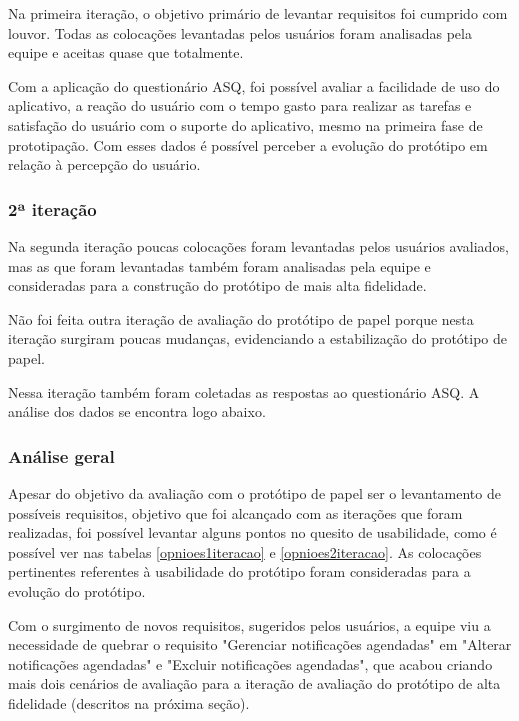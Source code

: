       Na primeira iteração, o objetivo primário de levantar requisitos foi cumprido com louvor.
      Todas as colocações levantadas pelos usuários foram analisadas pela equipe e aceitas quase que totalmente.
            
      Com a aplicação do questionário ASQ, foi possível avaliar a facilidade de uso do aplicativo, a reação do usuário 
      com o tempo gasto para realizar as tarefas e satisfação do usuário com o suporte do aplicativo, mesmo na primeira
      fase de prototipação. Com esses dados é possível perceber a evolução do protótipo em relação à percepção do usuário.
      
    \subsubsection{2ª iteração}
    
      Na segunda iteração poucas colocações foram levantadas pelos usuários avaliados, mas as que foram levantadas também foram
      analisadas pela equipe e consideradas para a construção do protótipo de mais alta fidelidade.
      
      Não foi feita outra iteração de avaliação do protótipo de papel porque nesta iteração surgiram poucas mudanças,
      evidenciando a estabilização do protótipo de papel.
      
      Nessa iteração também foram coletadas as respostas ao questionário ASQ. A análise dos dados se encontra logo abaixo.
    
    \subsubsection{Análise geral}
      
      Apesar do objetivo da avaliação com o protótipo de papel ser o levantamento de possíveis requisitos,
      objetivo que foi alcançado com as iterações que foram realizadas, foi possível levantar alguns pontos
      no quesito de usabilidade, como é possível ver nas tabelas \ref{opnioes1iteracao} e \ref{opnioes2iteracao}.
      As colocações pertinentes referentes à usabilidade do protótipo foram consideradas para a evolução do protótipo.
      
      Com o surgimento de novos requisitos, sugeridos pelos usuários, a equipe viu a necessidade de quebrar o requisito
      "Gerenciar notificações agendadas" em "Alterar notificações agendadas" e "Excluir notificações agendadas", que acabou
      criando mais dois cenários de avaliação para a iteração de avaliação do protótipo de alta fidelidade (descritos
       na próxima seção).
      
